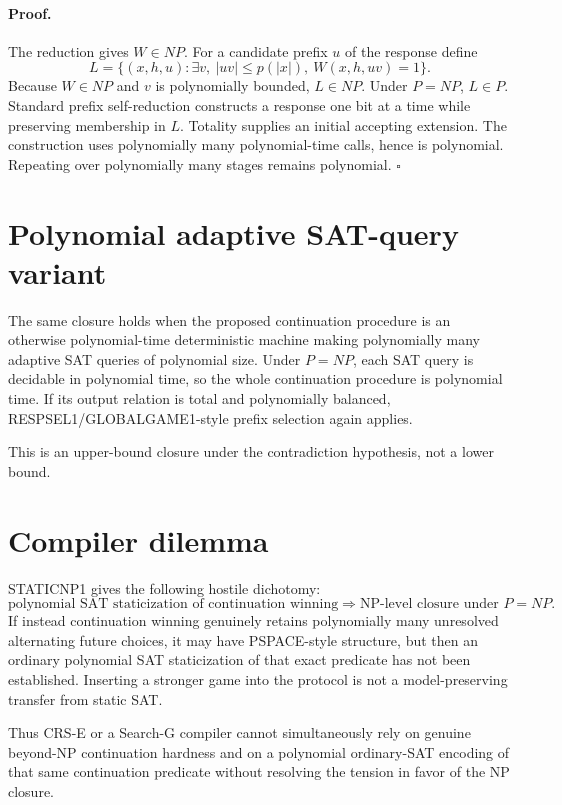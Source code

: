 \documentclass[11pt]{article}
\begin{document}
\paragraph{Proof.}
The reduction gives \(W\in NP\). For a candidate prefix \(u\) of the response define
\[
L=\{(x,h,u):\exists v,\ |uv|\le p(|x|),\ W(x,h,uv)=1\}.
\]
Because \(W\in NP\) and \(v\) is polynomially bounded, \(L\in NP\). Under \(P=NP\), \(L\in P\). Standard prefix self-reduction constructs a response one bit at a time while preserving membership in \(L\). Totality supplies an initial accepting extension. The construction uses polynomially many polynomial-time calls, hence is polynomial. Repeating over polynomially many stages remains polynomial. \(\square\)

\section*{Polynomial adaptive SAT-query variant}
The same closure holds when the proposed continuation procedure is an otherwise polynomial-time deterministic machine making polynomially many adaptive SAT queries of polynomial size. Under \(P=NP\), each SAT query is decidable in polynomial time, so the whole continuation procedure is polynomial time. If its output relation is total and polynomially balanced, RESPSEL1/GLOBALGAME1-style prefix selection again applies.

This is an upper-bound closure under the contradiction hypothesis, not a lower bound.

\section*{Compiler dilemma}
STATICNP1 gives the following hostile dichotomy:
\[
\boxed{\text{polynomial SAT staticization of continuation winning}
\Longrightarrow \text{NP-level closure under }P=NP.}
\]
If instead continuation winning genuinely retains polynomially many unresolved alternating future choices, it may have PSPACE-style structure, but then an ordinary polynomial SAT staticization of that exact predicate has not been established. Inserting a stronger game into the protocol is not a model-preserving transfer from static SAT.

Thus CRS-E or a Search-G compiler cannot simultaneously rely on genuine beyond-NP continuation hardness and on a polynomial ordinary-SAT encoding of that same continuation predicate without resolving the tension in favor of the NP closure.
\end{document}
